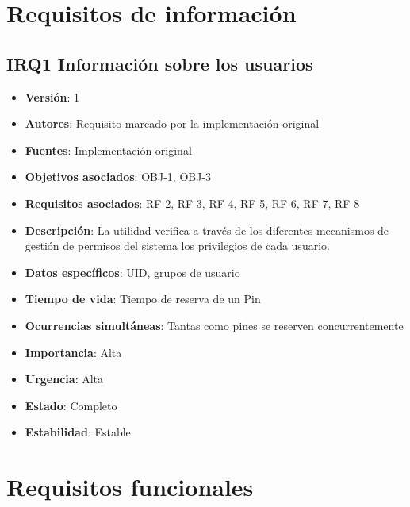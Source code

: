 \documentclass[letterpaper,10pt,spanish]{sphinxmanual}
\begin{document}
\chapter{Requisitos de información}
\label{analysis/ir::doc}\label{analysis/ir:requisitos-de-informacion}

\section{\textbf{IRQ1} Información sobre los usuarios}
\label{analysis/ir:irq1-informacion-sobre-los-usuarios}\begin{itemize}
\item {} 
\textbf{Versión}: 1

\item {} 
\textbf{Autores}: Requisito marcado por la implementación original

\item {} 
\textbf{Fuentes}: Implementación original

\item {} 
\textbf{Objetivos asociados}: OBJ-1, OBJ-3

\item {} 
\textbf{Requisitos asociados}: RF-2, RF-3, RF-4, RF-5, RF-6, RF-7, RF-8

\item {} 
\textbf{Descripción}: La utilidad verifica a través de los diferentes mecanismos de gestión de permisos del sistema los privilegios de cada usuario.

\item {} 
\textbf{Datos específicos}: UID, grupos de usuario

\item {} 
\textbf{Tiempo de vida}: Tiempo de reserva de un Pin

\item {} 
\textbf{Ocurrencias simultáneas}: Tantas como pines se reserven concurrentemente

\item {} 
\textbf{Importancia}: Alta

\item {} 
\textbf{Urgencia}: Alta

\item {} 
\textbf{Estado}: Completo

\item {} 
\textbf{Estabilidad}: Estable

\end{itemize}


\chapter{Requisitos funcionales}
\label{analysis/fr:requisitos-funcionales}\label{analysis/fr::doc}
\end{document}
